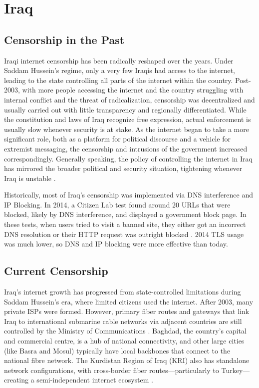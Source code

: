 \section{Iraq}
\label{sec:Iraq-Censorship}

\subsection{Censorship in the Past}

Iraqi internet censorship has been radically reshaped over the years. Under Saddam Hussein's regime, only a very few Iraqis had access to the internet, leading to the state controlling all parts of the internet within the country. Post-2003, with more people accessing the internet and the country struggling with internal conflict and the threat of radicalization, censorship was decentralized and usually carried out with little transparency and regionally differentiated. While the constitution and laws of Iraq recognize free expression, actual enforcement is usually slow whenever security is at stake. As the internet began to take a more significant role, both as a platform for political discourse and a vehicle for extremist messaging, the censorship and intrusions of the government increased correspondingly. Generally speaking, the policy of controlling the internet in Iraq has mirrored the broader political and security situation, tightening whenever Iraq is unstable \cite{freedomhouseIraqFreedom}.

Historically, most of Iraq's censorship was implemented via DNS interference and IP Blocking. In 2014, a Citizen Lab test found around 20 URLs that were blocked, likely by DNS interference, and displayed a government block page. In these tests, when users tried to visit a banned site, they either got an incorrect DNS resolution or their HTTP request was outright blocked \cite{citizenlabIraqPastCensorship}. 2014 TLS usage was much lower, so DNS and IP blocking were more effective than today. 

\subsection{Current Censorship}

Iraq's internet growth has progressed from state-controlled limitations during Saddam Hussein's era, where limited citizens used the internet. After 2003, many private ISPs were formed. However, primary fiber routes and gateways that link Iraq to international submarine cable networks via adjacent countries are still controlled by the Ministry of Communications \cite{IraqCMC}. Baghdad, the country's capital and commercial centre, is a hub of national connectivity, and other large cities (like Basra and Mosul) typically have local backbones that connect to the national fibre network. The Kurdistan Region of Iraq (KRI) also has standalone network configurations, with cross-border fiber routes—particularly to Turkey—creating a semi-independent internet ecosystem \cite{freedomhouseIraqFreedom}. 

